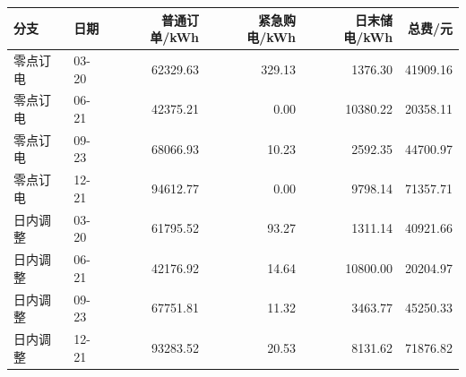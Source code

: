 \begin{tabular}{llrrrr}
\toprule
分支 & 日期 & 普通订单/kWh & 紧急购电/kWh & 日末储电/kWh & 总费/元 \\
\midrule
零点订电 & 03-20 & 62329.63 & 329.13 & 1376.30 & 41909.16 \\
零点订电 & 06-21 & 42375.21 & 0.00 & 10380.22 & 20358.11 \\
零点订电 & 09-23 & 68066.93 & 10.23 & 2592.35 & 44700.97 \\
零点订电 & 12-21 & 94612.77 & 0.00 & 9798.14 & 71357.71 \\
日内调整 & 03-20 & 61795.52 & 93.27 & 1311.14 & 40921.66 \\
日内调整 & 06-21 & 42176.92 & 14.64 & 10800.00 & 20204.97 \\
日内调整 & 09-23 & 67751.81 & 11.32 & 3463.77 & 45250.33 \\
日内调整 & 12-21 & 93283.52 & 20.53 & 8131.62 & 71876.82 \\
\bottomrule
\end{tabular}
